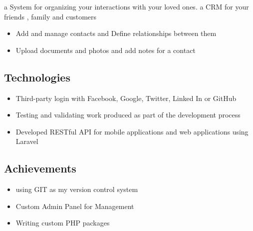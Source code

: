 \documentclass[A4,11pt]{article}
\makeatletter
\newcommand{\resumeItem}[2]{
  \item{
    \textbf{#1}{: #2 \vspace{-2pt}}
  }
}
\newcommand{\resumeProjectItem}[1]{
  \item{
    { #1 \vspace{-2pt}}
  }
}
\newcommand{\resumeSubheading}[4]{
  \vspace{-1pt}\item
    \begin{tabular*}{0.97\textwidth}[t]{l@{\extracolsep{\fill}}r}
      \textbf{#1} & #2 \\
      \textit{#3} & \textit{\small #4} \\
    \end{tabular*}\vspace{-5pt}
}
\newcommand{\resumeItemListStart}{\begin{itemize}}
\newcommand{\resumeItemListEnd}{\end{itemize}\vspace{-5pt}}
\makeatother
\begin{document}
      \vspace{20pt}

	{a System for organizing your interactions with your loved ones. a CRM for your friends , family and customers }
      
      \resumeItemListStart
        \resumeProjectItem
          {Add and manage contacts and Define relationships between them}
        \resumeProjectItem
          {Upload documents and photos and add notes for a contact}
      \resumeItemListEnd
      
      
      \subsection*{Technologies}
	\resumeItemListStart
        \resumeProjectItem{Third-party login with Facebook, Google, Twitter, Linked In or GitHub}
        \resumeProjectItem{Testing and validating work produced as part of the development process}
	\resumeProjectItem{Developed RESTful API for mobile applications and web applications using Laravel}
      \resumeItemListEnd



	\subsection*{Achievements}
	\resumeItemListStart
        \resumeProjectItem{using GIT as my version control system}
        \resumeProjectItem{Custom Admin Panel for Management}
	\resumeProjectItem{Writing custom PHP packages }
      \resumeItemListEnd
    
    \begin{comment}
    \resumeSubheading
      {Lucena Research}{Atlanta, GA}
      {Data Scientist}{Summer 2012 and 2013}
      \resumeItemListStart
        \resumeItem{Portfolio Management}
          {Created models for portfolio hedging,  portfolio optimization and price forecasting. Also creating a strategy backtesting engine used for simulating and backtesting strategies.}
        \resumeItem{QuantDesk}
          {Python backend for a web application used by hedge fund managers for portfolio management.}
      \resumeItemListEnd

    \resumeSubheading
      {Georgia Institute of Technology}{Atlanta, GA}
      {Research and Teaching Assistant}{Jan 2012 - Dec 2013}
      \resumeItemListStart
        \resumeItem{Research Assistant - Machine Learning}
          {Research on machine learning for portfolio hedging and replication algorithms. Modeling low-risk \& continuous-return strategies. Developed the python library QSTK.}
        \resumeItem{Teaching Assistant - Computational Investing}
          {The online course on Coursera, had more than 100,000 students enrolled. It was featured on the 11 Alive News and the Atlanta Journal Constitution. Involved in creating assignment, exams and conducting recitation sessions. Also taught the on-campus version of the course.}
      \resumeItemListEnd

\end{comment}
\end{document}
